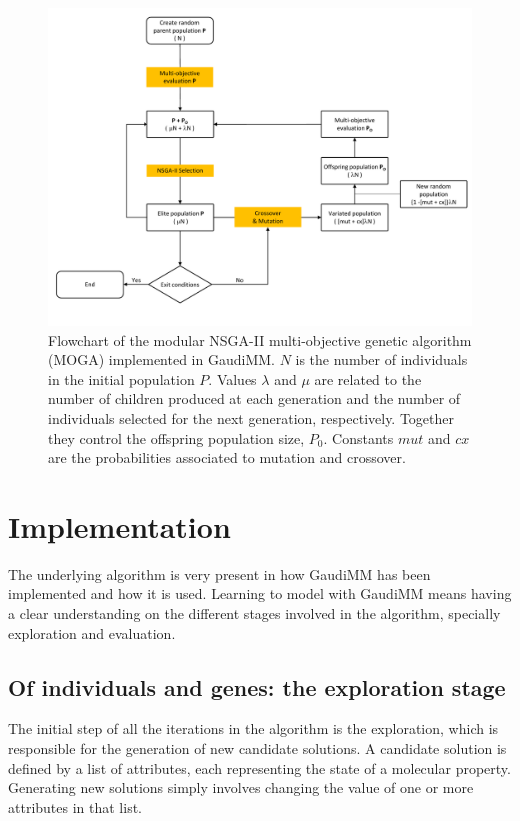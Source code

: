 \begin{figure} %
	\vspace*{-1cm}
	\includegraphics[width=0.9\textheight,angle=90]{./figures/04/nsga.pdf}
	\cprotect\caption[NSGA-II algorithm]{Flowchart of the modular NSGA-II multi-objective genetic algorithm (MOGA) implemented in GaudiMM. $ N $ is the number of individuals in the initial population $P$. Values $\lambda$ and $\mu$ are related to the number of children produced at each generation and the number of individuals selected for the next generation, respectively. Together they control the offspring population size, $ P_{0} $. Constants $ mut $ and $ cx $ are the probabilities associated to mutation and crossover.}
	\label{fig:nsga}
\end{figure}


\section{Implementation}

The underlying algorithm is very present in how GaudiMM has been implemented and how it is used. Learning to model with GaudiMM means having a clear understanding on the different stages involved in the algorithm, specially exploration and evaluation.

\subsection{Of individuals and genes: the exploration stage}
The initial step of all the iterations in the algorithm is the exploration, which is responsible for the generation of new candidate solutions. A candidate solution is defined by a list of attributes, each representing the state of a molecular property. Generating new solutions simply involves changing the value of one or more attributes in that list.

